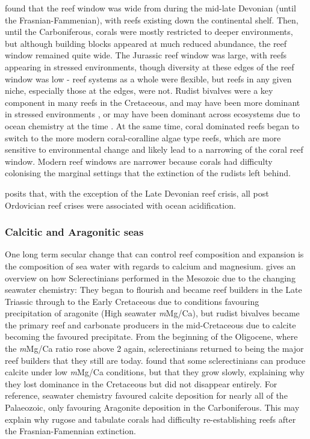 \documentclass[11pt,a4paper]{article}
\begin{document}
\cite{Leinfelder1999} found that the reef window was wide from during the mid-late Devonian (until the Frasnian-Fammenian), with reefs existing down the continental shelf.
 Then, until the Carboniferous, corals were mostly restricted to deeper environments, but although building blocks appeared at much reduced abundance, the reef window remained quite wide.
 The Jurassic reef window was large, with reefs appearing in stressed environments, though diversity at these edges of the reef window was low - reef systems as a whole were flexible, but reefs in any given niche, especially those at the edges, were not.
 Rudist bivalves were a key component in many reefs in the Cretaceous, and may have been more dominant in stressed environments \citep{Leinfelder1999}, or may have been dominant across ecosystems due to ocean chemistry at the time \citep{Ries2006}.
 At the same time, coral dominated reefs began to switch to the more modern coral-coralline algae type reefs, which are more sensitive to environmental change and likely lead to a narrowing of the coral reef window.
 Modern reef windows are narrower because corals had difficulty colonising the marginal settings that the extinction of the rudists left behind.

\cite{Kiessling2011} posits that, with the exception of the Late Devonian reef crisis, all post Ordovician reef crises were associated with ocean acidification.%

\subsubsection{Calcitic and Aragonitic seas}
One long term secular change that can control reef composition and expansion is the composition of sea water with regards to calcium and magnesium.
 \cite{Ries2006} gives an overview on how Sclerectinians performed in the Mesozoic due to the changing seawater chemistry: They began to flourish and became reef builders in the Late Triassic through to the Early Cretaceous due to conditions favouring precipitation of aragonite (High seawater \textit{m}Mg/Ca), but rudist bivalves became the primary reef and carbonate producers in the mid-Cretaceous due to calcite becoming the favoured precipitate.
 From the beginning of the Oligocene, where the \textit{m}Mg/Ca ratio rose above 2 again, sclerectinians returned to being the major reef builders that they still are today.
 \cite{Ries2006} found that some sclerectinians can produce calcite under low \textit{m}Mg/Ca conditions, but that they grow slowly, explaining why they lost dominance in the Cretaceous but did not disappear entirely.
 For reference, seawater chemistry favoured calcite deposition for nearly all of the Palaeozoic, only favouring Aragonite deposition in the Carboniferous.
 This may explain why rugose and tabulate corals had difficulty re-establishing reefs after the Frasnian-Famennian extinction.
\end{document}
